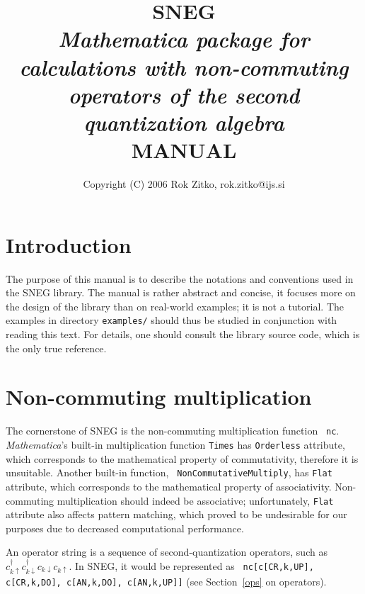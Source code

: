 \documentclass[a4paper,10pt,openany]{book}
\begin{document}
\title{SNEG\\
{\it Mathematica package for calculations with non-commuting
operators of the second quantization algebra}\\
MANUAL
}

\author{Copyright (C) 2006 Rok Zitko, rok.zitko@ijs.si}
\date{}

\maketitle


\newcommand{\nc}{\mathrm{nc}}
\newcommand{\vc}[1]{\mathbf{#1}}
\newcommand{\ket}[1]{| #1 \rangle}
\newcommand{\bra}[1]{\langle #1 |}

\section{Introduction}

The purpose of this manual is to describe the notations and
conventions used in the SNEG library. The manual is rather abstract
and concise, it focuses more on the design of the library than on
real-world examples; it is not a tutorial. The examples in directory
{\tt examples/} should thus be studied in conjunction with reading
this text. For details, one should consult the library source code,
which is the only true reference.

\section{Non-commuting multiplication}

The cornerstone of SNEG is the non-commuting multiplication function {\tt
nc}. {\it Mathematica}'s built-in multiplication function {\tt Times} has
{\tt Orderless} attribute, which corresponds to the mathematical property of
commutativity, therefore it is unsuitable. Another built-in function, {\tt
NonCommutativeMultiply}, has {\tt Flat} attribute, which corresponds to the
mathematical property of associativity. Non-commuting multiplication should
indeed be associative; unfortunately, {\tt Flat} attribute also affects
pattern matching, which proved to be undesirable for our purposes due to
decreased computational performance.

An operator string is a sequence of second-quantization operators,
such as $c^\dag_{k\uparrow} c^\dag_{k\downarrow} c_{k\downarrow}
c_{k\uparrow}$.  In SNEG, it would be represented as {\tt
  nc[c[CR,k,UP], c[CR,k,DO], c[AN,k,DO], c[AN,k,UP]]} (see
Section~\ref{ops} on operators).
\end{document}
